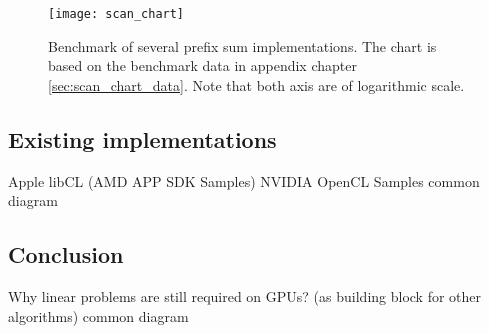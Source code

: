 



\begin{figure}
\centering
\texttt{[image: scan\_chart]}
\caption{Benchmark of several prefix sum implementations. The chart is based on the benchmark data in appendix chapter \ref{sec:scan_chart_data}. Note that both axis are of logarithmic scale.}
\label{fig:scan_chart}
\end{figure}

\subsection{Existing implementations}
Apple
libCL
(AMD APP SDK Samples)
NVIDIA OpenCL Samples
common diagram

\subsection{Conclusion}
Why linear problems are still required on GPUs? (as building block for other algorithms)
common diagram
